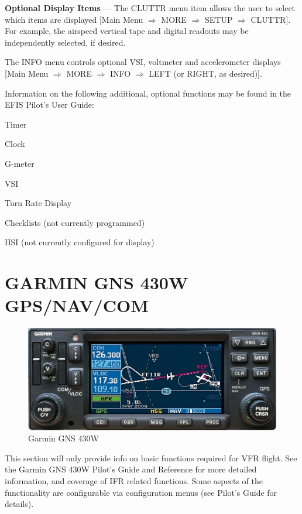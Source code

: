 \textbf{Optional Display Items} --- The CLUTTR menu item allows the user to select which items are displayed {[}Main Menu $\Rightarrow$ MORE $\Rightarrow$ SETUP $\Rightarrow$ CLUTTR{]}. For example, the airspeed vertical tape and digital readouts may be independently selected, if desired.

The INFO menu controls optional VSI, voltmeter and accelerometer displays {[}Main Menu $\Rightarrow$ MORE $\Rightarrow$ INFO $\Rightarrow$ LEFT (or RIGHT, as desired){]}.

Information on the following additional, optional functions may be found in the EFIS Pilot's User Guide:

\begin{itemize*}
\item Timer
\item Clock
\item G-meter
\item VSI
\item Turn Rate Display
\item Checklists (not currently programmed)
\item HSI (not currently configured for display)
\end{itemize*}

\section{GARMIN GNS 430W GPS/NAV/COM}
\begin{figure}
[htb]
\begin{center}
\includegraphics[scale=0.8]{../Diagrams/gns430_1}
\end{center}
\caption{Garmin GNS 430W}
\end{figure}

This section will only provide info on basic functions required for VFR flight. See the Garmin GNS 430W Pilot's Guide and Reference for more detailed information, and coverage of IFR related functions. Some aspects of the functionality are configurable via configuration menus (see Pilot's Guide for details).

